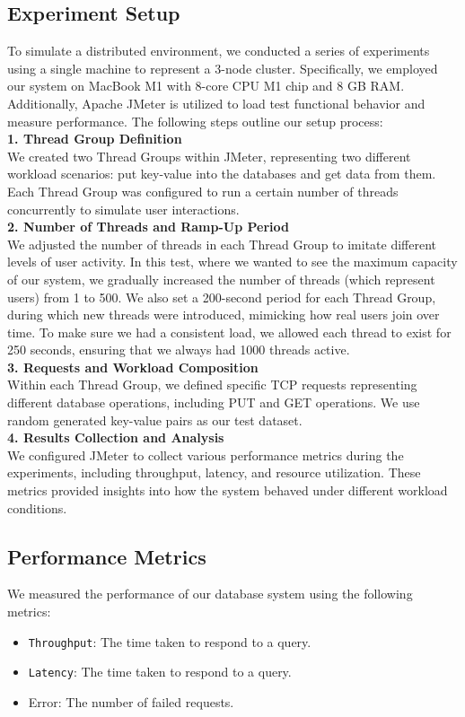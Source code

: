 \documentclass[sigconf]{acmart}
\begin{document}
\subsection{Experiment Setup}
To simulate a distributed environment, we conducted a series of experiments using a single machine to represent a 3-node cluster. Specifically, we employed our system on MacBook M1 with 8-core CPU M1 chip and 8 GB RAM. Additionally, Apache JMeter is utilized to load test functional behavior and measure performance.  The following steps outline our setup process: \\
\textbf{1. Thread Group Definition\\ }
We created two Thread Groups within JMeter, representing two different workload scenarios: put key-value into the databases and get data from them. Each Thread Group was configured to run a certain number of threads concurrently to simulate user interactions.\\
\textbf{2. Number of Threads and Ramp-Up Period\\}
We adjusted the number of threads in each Thread Group to imitate different levels of user activity. In this test, where we wanted to see the maximum capacity of our system, we gradually increased the number of threads (which represent users) from 1 to 500. We also set a 200-second period for each Thread Group, during which new threads were introduced, mimicking how real users join over time. To make sure we had a consistent load, we allowed each thread to exist for 250 seconds, ensuring that we always had 1000 threads active.\\
\textbf{3. Requests and Workload Composition\\ }
Within each Thread Group, we defined specific TCP requests representing different database operations, including PUT and GET operations. We use random generated key-value pairs as our test dataset.\\
\textbf{4. Results Collection and Analysis\\}
We configured JMeter to collect various performance metrics during the experiments, including throughput, latency, and resource utilization. These metrics provided insights into how the system behaved under different workload conditions.

\subsection{Performance Metrics}
We measured the performance of our database system using the following metrics:
\begin{itemize}
    \item {\texttt{Throughput}}: The time taken to respond to a query.
    \item {\texttt{Latency}}: The time taken to respond to a query.
    \item {Error}: The number of failed requests.
\end{itemize}
\end{document}
